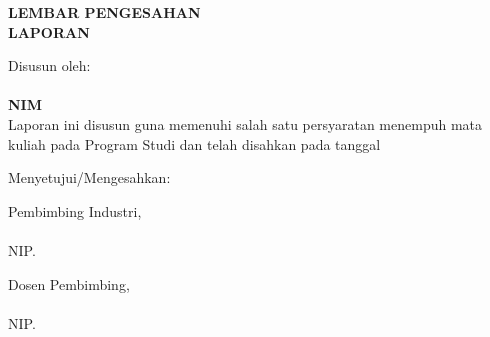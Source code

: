 
\newpage
{}
\begin{center}
    \begin{doublespace}
        \textbf{\large \MakeUppercase{lembar pengesahan}}\\
        \textbf{\large \MakeUppercase{Laporan {\tipe}}}
    \end{doublespace}
\end{center}

\begin{center}
    \begin{doublespace}
        \textbf{\large \MakeUppercase {\judulid}}
    \end{doublespace}
\end{center}

\begin{center}
    Disusun oleh:\\
    \textbf{\penulis}\\
    \textbf{NIM \nim}\\[1.5cm]

    Laporan ini disusun guna memenuhi salah satu persyaratan menempuh mata kuliah {\tipe} pada Program Studi {\prodi} {\fakultas} {\universitas} dan telah disahkan pada tanggal \tglpengesahan\\[0.75cm]
\end{center}

\begin{center}
    Menyetujui/Mengesahkan:\\
\end{center}

\begin{minipage}{0.35\textwidth}
    Pembimbing Industri,\\[2cm]
    \pembimbingindustri\\
    NIP. \NIKpembimbingindustri
\end{minipage}
\hfill
\begin{minipage}{0.47\textwidth}
    Dosen Pembimbing,\\[2cm]
    \pembimbing\\
    NIP. \NIPpembimbing
\end{minipage}%

